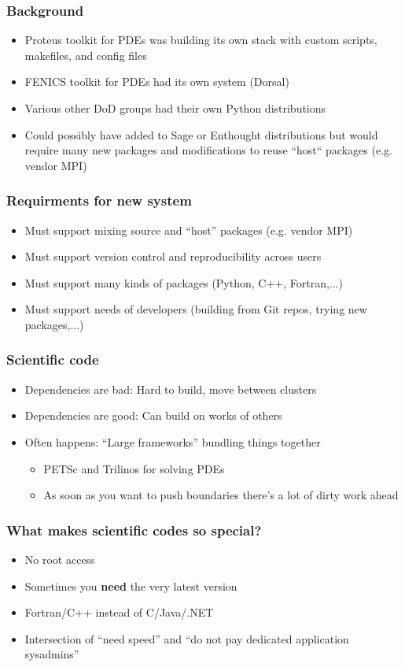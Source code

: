 \documentclass[sans,mathserif]{beamer}
\begin{document}
\begin{frame}
\frametitle{Background}
\begin{itemize}
\item Proteus toolkit for PDEs was building its own stack with custom scripts, makefiles, and config files
\item FENICS toolkit  for PDEs had its own system (Dorsal)
\item Various other DoD groups had their own Python distributions
\item Could possibly have added to Sage or Enthought distributions but would
    require many new packages and modifications to reuse ``host`` packages
    (e.g. vendor MPI)
\end{itemize}
\end{frame}

\begin{frame}
\frametitle{Requirments for new system}
\begin{itemize}
\item Must support mixing source and ``host'' packages (e.g. vendor MPI)
\item Must support version control and reproducibility across users
\item Must support many kinds of packages (Python, C++, Fortran,...)
\item Must support needs of developers (building from Git repos, trying new packages,...)
\end{itemize}
\end{frame}

\begin{frame}
  \frametitle{Scientific code}
  \begin{itemize}
  \item<+-> Dependencies are bad: Hard to build, move between clusters
  \item<+-> Dependencies are good: Can build on works of others
  \item<+-> Often happens: ``Large frameworks'' bundling things together
    \begin{itemize}
    \item<+-> PETSc and Trilinos for solving PDEs
    \item<+-> As soon as you want to push boundaries there's a lot of dirty work ahead
    \end{itemize}
  \end{itemize}
\end{frame}

\begin{frame}[fragile]
  \frametitle{What makes scientific codes so special?}

  \begin{itemize}
    \item<+-> No root access
    \item<+-> Sometimes you {\bf need} the very latest version
    \item<+-> Fortran/C++ instead of C/Java/.NET
    \item<+-> Intersection of ``need speed'' and ``do not pay dedicated application sysadmins''
  \end{itemize}
\end{frame}
\end{document}
